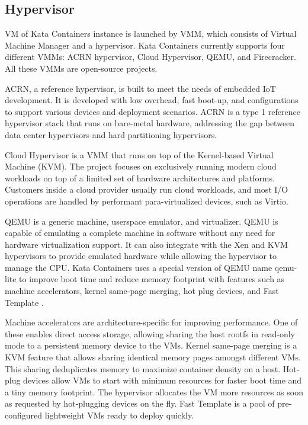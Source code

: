 \subsection{Hypervisor}

VM of Kata Containers instance is launched by VMM, which consists of Virtual Machine Manager and a hypervisor. Kata Containers currently supports four different VMMs: ACRN hypervisor, Cloud Hypervisor, QEMU, and Firecracker. All these VMMs are open-source projects.

ACRN, a reference hypervisor, is built to meet the needs of embedded IoT development. It is developed with low overhead, fast boot-up, and configurations to support various devices and deployment scenarios. ACRN is a type 1 reference hypervisor stack that runs on bare-metal hardware, addressing the gap between data center hypervisors and hard partitioning hypervisors. \cite{ACRN}

Cloud Hypervisor is a VMM that runs on top of the Kernel-based Virtual Machine (KVM). The project focuses on exclusively running modern cloud workloads on top of a limited set of hardware architectures and platforms. Customers inside a cloud provider usually run cloud workloads, and most I/O operations are handled by performant para-virtualized devices, such as Virtio. \cite{CloudHypervisor}

QEMU is a generic machine, userspace emulator, and virtualizer. QEMU is capable of emulating a complete machine in software without any need for hardware virtualization support. It can also integrate with the Xen and KVM hypervisors to provide emulated hardware while allowing the hypervisor to manage the CPU. Kata Containers uses a special version of QEMU name qemu-lite to improve boot time and reduce memory footprint with features such as machine accelerators, kernel same-page merging, hot plug devices, and Fast Template \cite{Randazzo2019}. \cite{QEMUGithub}\cite{QEMU}

Machine accelerators are architecture-specific for improving performance. One of these enables direct access storage, allowing sharing the host rootfs in read-only mode to a persistent memory device to the VMs. Kernel same-page merging is a KVM feature that allows sharing identical memory pages amongst different VMs. This sharing deduplicates memory to maximize container density on a host. Hot-plug devices allow VMs to start with minimum resources for faster boot time and a tiny memory footprint. The hypervisor allocates the VM more resources as soon as requested by hot-plugging devices on the fly. Fast Template is a pool of pre-configured lightweight VMs ready to deploy quickly. \cite{Randazzo2019}

